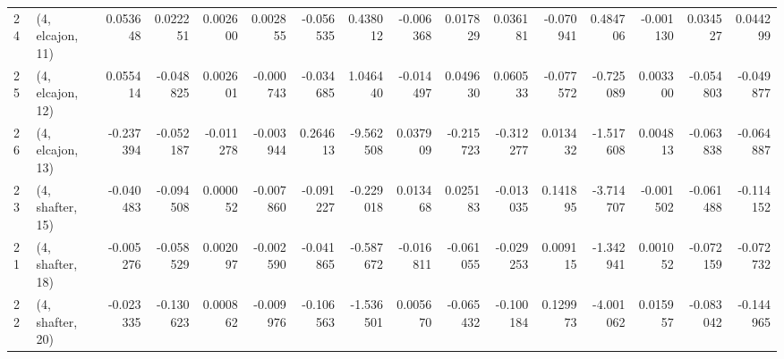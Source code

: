 \begin{tabular}{llrrrrrrrrrrrrrr}
24 &  (4, elcajon, 11) &  0.053648 &  0.022251 &   0.002600 &  0.002855 & -0.056535 &   0.438012 & -0.006368 &   0.017829 &  0.036181 & -0.070941 &    0.484706 & -0.001130 &  0.034527 &  0.044299 \\
25 &  (4, elcajon, 12) &  0.055414 & -0.048825 &   0.002601 & -0.000743 & -0.034685 &   1.046440 & -0.014497 &   0.049630 &  0.060533 & -0.077572 &   -0.725089 &  0.003300 & -0.054803 & -0.049877 \\
26 &  (4, elcajon, 13) & -0.237394 & -0.052187 &  -0.011278 & -0.003944 &  0.264613 &  -9.562508 &  0.037909 &  -0.215723 & -0.312277 &  0.013432 &   -1.517608 &  0.004813 & -0.063838 & -0.064887 \\
23 &  (4, shafter, 15) & -0.040483 & -0.094508 &   0.000052 & -0.007860 & -0.091227 &  -0.229018 &  0.013468 &   0.025183 & -0.013035 &  0.141895 &   -3.714707 & -0.001502 & -0.061488 & -0.114152 \\
21 &  (4, shafter, 18) & -0.005276 & -0.058529 &   0.002097 & -0.002590 & -0.041865 &  -0.587672 & -0.016811 &  -0.061055 & -0.029253 &  0.009115 &   -1.342941 &  0.001052 & -0.072159 & -0.072732 \\
22 &  (4, shafter, 20) & -0.023335 & -0.130623 &   0.000862 & -0.009976 & -0.106563 &  -1.536501 &  0.005670 &  -0.065432 & -0.100184 &  0.129973 &   -4.001062 &  0.015957 & -0.083042 & -0.144965 \\
\bottomrule
\end{tabular}
